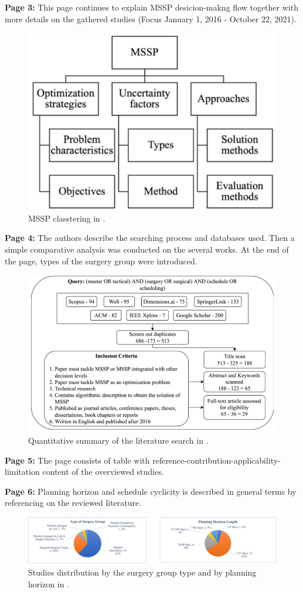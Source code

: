     \textbf{Page 3:}
    This page continues to explain MSSP desicion-makng flow together with more details on the gathered studies (Focus January 1, 2016 - October 22, 2021).
    \begin{figure}[H]
        \centering
        \includegraphics[width=.6\textwidth]{figures/SR0007MY22/fig1.png}
        \caption{MSSP classtering in \cite{x236}.}
        \label{fig1:SR0007MY22}
    \end{figure}

    \textbf{Page 4:}
    The authors describe the searching process and databases used. Then a simple comparative analysis was conducted on the several works. At the end of the page, types of the surgery group were introduced. 
    \begin{figure}[H]
        \centering
        \includegraphics[width=.8\textwidth]{figures/SR0007MY22/fig2.png}
        \caption{Quantitative summary of the literature search in \cite{x236}.}
        \label{fig2:SR0007MY22}
    \end{figure}

    \textbf{Page 5:}
    The page consists of table with reference-contribution-applicability-limitation content of the overviewed studies.

    \textbf{Page 6:}
    Planning horizon and schedule cyclicity is described in general terms by referencing on the reviewed literature.
    \begin{figure}[H]
        \centering
        \includegraphics[width=1\textwidth]{figures/SR0007MY22/fig3.png}
        \caption{Studies distribution by the surgery group type and by planning horizon in \cite{x236}.}
        \label{fig3:SR0007MY22}
    \end{figure}

